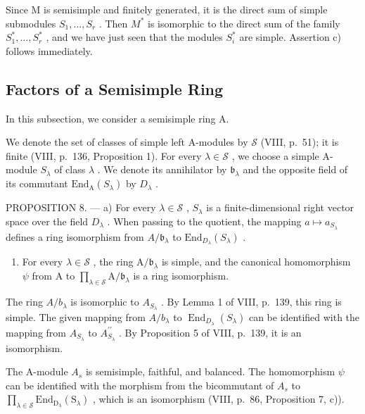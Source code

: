 Since M is semisimple and finitely generated, it is the direct sum of simple submodules \(S_{1},\ldots,S_{r}\) . Then \(M^{*}\) is isomorphic to the direct sum of the family \(S_{1}^{*},\ldots,S_{r}^{*}\) , and we have just seen that the modules \(S_{i}^{*}\) are simple. Assertion c) follows immediately.

\subsection{Factors of a Semisimple Ring}

In this subsection, we consider a semisimple ring A.

We denote the set of classes of simple left A-modules by \(\mathcal{S}\) (VIII, p.~51); it is finite (VIII, p.~136, Proposition 1). For every \(\lambda \in \mathcal{S}\) , we choose a simple A-module \(S_{\lambda}\) of class \(\lambda\) . We denote its annihilator by \(\mathfrak{b}_{\lambda}\) and the opposite field of its commutant \(\mathrm{End}_{\mathrm{A}}(S_{\lambda})\) by \(D_{\lambda}\) .

PROPOSITION 8. --- a) For every \(\lambda \in \mathcal{S}\) , \(S_{\lambda}\) is a finite-dimensional right vector space over the field \(D_{\lambda}\) . When passing to the quotient, the mapping \(a \mapsto a_{S_{\lambda}}\) defines a ring isomorphism from \(A / \mathfrak{b}_{\lambda}\) to \(\mathrm{End}_{D_{\lambda}}(S_{\lambda})\) .

\begin{enumerate}
\def\labelenumi{\alph{enumi})}
\setcounter{enumi}{1}
\tightlist
\item
  For every \(\lambda \in \mathcal{S}\) , the ring \(\mathrm{A} / \mathfrak{b}_{\lambda}\) is simple, and the canonical homomorphism \(\psi\) from \(\mathrm{A}\) to \(\prod_{\lambda \in \mathcal{S}}\mathrm{A} / \mathfrak{b}_{\lambda}\) is a ring isomorphism.
\end{enumerate}

The ring \(A/b_{\lambda}\) is isomorphic to \(A_{S_{\lambda}}\) . By Lemma 1 of VIII, p.~139, this ring is simple. The given mapping from \(A/b_{\lambda}\) to \(\operatorname{End}_{D_{\lambda}}(S_{\lambda})\) can be identified with the mapping from \(A_{S_{\lambda}}\) to \(A_{S_{\lambda}}^{\prime\prime}\) . By Proposition 5 of VIII, p.~139, it is an isomorphism.

The A-module \(A_{s}\) is semisimple, faithful, and balanced. The homomorphism \(\psi\) can be identified with the morphism from the bicommutant of \(A_{s}\) to \(\prod_{\lambda\in\mathcal{S}}\mathrm{End}_{\mathrm{D}_{\lambda}}(\mathrm{S}_{\lambda})\) , which is an isomorphism (VIII, p.~86, Proposition 7, c)).

